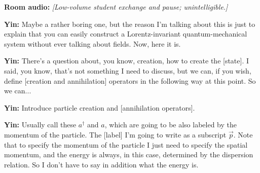 
\noindent\textbf{Room audio:} \textit{[Low-volume student exchange and pause; unintelligible.]}\par

\noindent\textbf{Yin:} Maybe a rather boring one, but the reason I'm talking about this is just to explain that you can easily construct a Lorentz-invariant quantum-mechanical system without ever talking about fields. Now, here it is.\par

\noindent\textbf{Yin:} There's a question about, you know, creation, how to create the [state]. I said, you know, that's not something I need to discuss, but we can, if you wish, define [creation and annihilation] operators in the following way at this point. So we can...\par

\noindent\textbf{Yin:} Introduce particle creation and [annihilation operators].\par

\noindent\textbf{Yin:} Usually call these $a^\dagger$ and $a$, which are going to be also labeled by the momentum of the particle. The [label] I'm going to write as a subscript $\vec p$. Note that to specify the momentum of the particle I just need to specify the spatial momentum, and the energy is always, in this case, determined by the dispersion relation. So I don't have to say in addition what the energy is.\par

